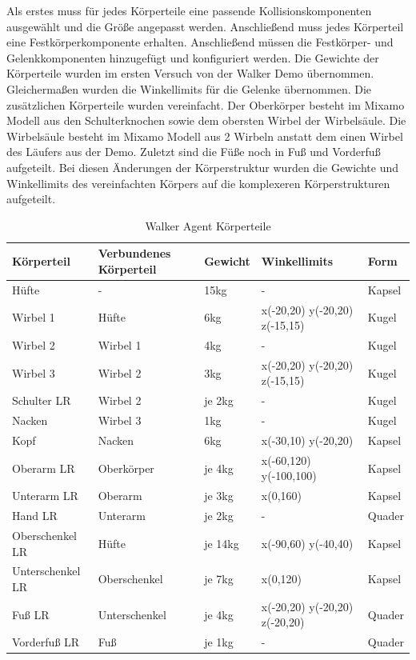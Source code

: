 Als erstes muss für jedes Körperteile eine passende Kollisionskomponenten ausgewählt und die Größe angepasst werden. Anschließend muss jedes Körperteil eine Festkörperkomponente erhalten. Anschließend müssen die Festkörper- und Gelenkkomponenten hinzugefügt und konfiguriert werden. Die Gewichte der Körperteile wurden im ersten Versuch von der Walker Demo übernommen. Gleichermaßen wurden die Winkellimits für die Gelenke übernommen. Die zusätzlichen Körperteile wurden vereinfacht. Der Oberkörper besteht im Mixamo Modell aus den Schulterknochen sowie dem obersten Wirbel der Wirbelsäule. Die Wirbelsäule besteht im Mixamo Modell aus 2 Wirbeln anstatt dem einen Wirbel des Läufers aus der Demo. Zuletzt sind die Füße noch in Fuß und Vorderfuß aufgeteilt. Bei diesen Änderungen der Körperstruktur wurden die Gewichte und Winkellimits des vereinfachten Körpers auf die komplexeren Körperstrukturen aufgeteilt.

\begin{table}[H]
  \centering
  {
  \begin{tabular}{ |p{3cm}|p{3cm}|p{2cm}|p{4cm}|p{2cm}| }
  \hline
  \textbf{Körpertei}l& \textbf{Verbundenes Körperteil} & \textbf{Gewicht} & \textbf{Winkellimits} & \textbf{Form} \\
  \hline
  Hüfte & - & 15kg & - & Kapsel \\
  \hline
  Wirbel 1 & Hüfte & 6kg & x(-20,20) y(-20,20) z(-15,15) & Kugel \\
  \hline
  Wirbel 2 & Wirbel 1 & 4kg & - & Kugel \\
  \hline
  Wirbel 3 & Wirbel 2 & 3kg & x(-20,20) y(-20,20) z(-15,15) & Kugel \\
  \hline
  Schulter LR & Wirbel 2 & je 2kg& - & Kugel \\
  \hline
  Nacken & Wirbel 3 & 1kg & - & Kugel \\
  \hline
  Kopf & Nacken & 6kg & x(-30,10) y(-20,20) & Kapsel \\
  \hline
  Oberarm LR & Oberkörper & je 4kg & x(-60,120) y(-100,100) & Kapsel \\
  \hline
  Unterarm LR & Oberarm & je 3kg & x(0,160) & Kapsel \\
  \hline
  Hand LR & Unterarm & je 2kg & - & Quader \\
  \hline
  Oberschenkel LR & Hüfte & je 14kg& x(-90,60) y(-40,40) & Kapsel \\
  \hline
  Unterschenkel LR & Oberschenkel & je 7kg &  x(0,120) & Kapsel \\
  \hline
  Fuß LR & Unterschenkel & je 4kg & x(-20,20) y(-20,20) z(-20,20) & Quader \\
  \hline
  Vorderfuß LR & Fuß & je 1kg & - & Quader \\
  \hline
  \end{tabular}}
  \caption{Walker Agent Körperteile}
  \label{table:walker_körperteile}
\end{table}

